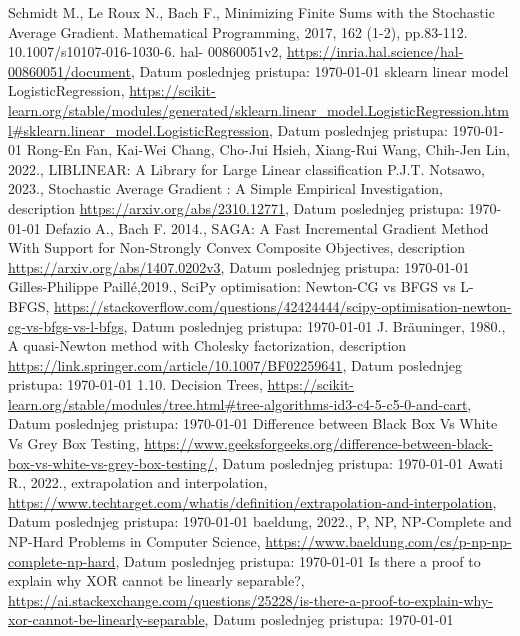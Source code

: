 \documentclass[fontsize=12bp, paper=a4]{scrarticle}
\begin{document}
\begin{thebibliography}{1}
    Schmidt M.,  Le Roux N.,  Bach F., Minimizing Finite Sums with the Stochastic Average
Gradient. Mathematical Programming, 2017, 162 (1-2), pp.83-112. 10.1007/s10107-016-1030-6. hal-
00860051v2, \url{https://inria.hal.science/hal-00860051/document}, Datum poslednjeg pristupa: \today
    sklearn linear model LogisticRegression, \url{https://scikit-learn.org/stable/modules/generated/sklearn.linear_model.LogisticRegression.html#sklearn.linear_model.LogisticRegression}, Datum poslednjeg pristupa: \today
    Rong-En Fan, Kai-Wei Chang, Cho-Jui Hsieh, Xiang-Rui Wang, Chih-Jen Lin, 2022., LIBLINEAR: A Library for Large Linear classification
    P.J.T. Notsawo, 2023., Stochastic Average Gradient : A Simple Empirical Investigation, description \url{https://arxiv.org/abs/2310.12771}, Datum poslednjeg pristupa: \today
    Defazio A., Bach F. 2014., SAGA: A Fast Incremental Gradient Method With Support for Non-Strongly Convex Composite Objectives, description \url{https://arxiv.org/abs/1407.0202v3}, Datum poslednjeg pristupa: \today
    Gilles-Philippe Paillé,2019., SciPy optimisation: Newton-CG vs BFGS vs L-BFGS, \url{https://stackoverflow.com/questions/42424444/scipy-optimisation-newton-cg-vs-bfgs-vs-l-bfgs}, Datum poslednjeg pristupa: \today
    J. Bräuninger, 1980., A quasi-Newton method with Cholesky factorization, description \url{https://link.springer.com/article/10.1007/BF02259641}, Datum poslednjeg pristupa: \today
    1.10. Decision Trees, \url{https://scikit-learn.org/stable/modules/tree.html#tree-algorithms-id3-c4-5-c5-0-and-cart}, Datum poslednjeg pristupa: \today
    Difference between Black Box Vs White Vs Grey Box Testing, \url{https://www.geeksforgeeks.org/difference-between-black-box-vs-white-vs-grey-box-testing/}, Datum poslednjeg pristupa: \today
     Awati R., 2022., extrapolation and interpolation, \url{https://www.techtarget.com/whatis/definition/extrapolation-and-interpolation}, Datum poslednjeg pristupa: \today
     baeldung, 2022., P, NP, NP-Complete and NP-Hard Problems in Computer Science, \url{https://www.baeldung.com/cs/p-np-np-complete-np-hard}, Datum poslednjeg pristupa: \today
     Is there a proof to explain why XOR cannot be linearly separable?, \url{https://ai.stackexchange.com/questions/25228/is-there-a-proof-to-explain-why-xor-cannot-be-linearly-separable}, Datum poslednjeg pristupa: \today

\end{thebibliography}
\end{document}
